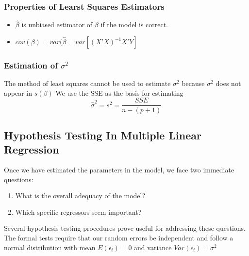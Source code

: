 \documentclass[11pt]{article}\usepackage[]{graphicx}\usepackage[]{xcolor}
\numberwithin{equation}{section}
\numberwithin{table}{section}
\begin{document}
\subsubsection*{Properties of Learst Squares Estimators}

\begin{itemize}
	\item $\hat{\beta}$ is unbiased estimator of $\beta$ if the model is correct.
	\item $cov(\beta)=var(\hat{\beta}=var[(X'X)^{-1}X'Y]$
\end{itemize}

\subsubsection*{Estimation of $\sigma^2$}
The method of least squares cannot be used to estimate $\sigma^2$ because $\sigma^2$ does not appear in $s(\beta)$
We use the SSE as the basis for estimating
$$
\hat{\sigma}^2=s^2=\frac{S S E}{n-(p+1)}
$$
\subsection{Hypothesis Testing In Multiple Linear Regression}

Once we have estimated the parameters in the model, we face two
immediate questions:\\
\begin{enumerate}
	\item What is the overall adequacy of the model?
	\item Which specific regressors seem important? 
\end{enumerate}
Several hypothesis testing procedures prove useful for addressing
these questions. The formal tests require that our random errors be
independent and follow a normal distribution with mean $E(\epsilon_i)= 0$
and variance  $Var(\epsilon_i)=\sigma^2$ \\
\end{document}
